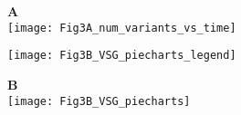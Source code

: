 \documentclass[10pt]{article}
\begin{document}
\begin{minipage}[t]{.35\linewidth}
  \textbf{A}\\
  \texttt{[image: Fig3A\_num\_variants\_vs\_time]}

  \vspace*{1mm}

  \hspace*{27mm}\texttt{[image: Fig3B\_VSG\_piecharts\_legend]}
\end{minipage}\hfill
\begin{minipage}[t]{.65\linewidth}
  \textbf{B}\\
  \texttt{[image: Fig3B\_VSG\_piecharts]}
\end{minipage}
\end{document}
